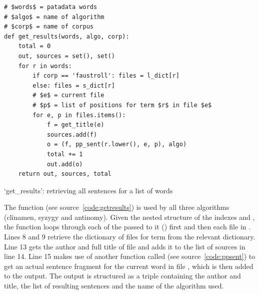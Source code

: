 \spirals


\begin{listing}
  \begin{verbatim}
# $words$ = patadata words
# $algo$ = name of algorithm
# $corp$ = name of corpus
def get_results(words, algo, corp):
    total = 0
    out, sources = set(), set()
    for r in words:
        if corp == 'faustroll': files = l_dict[r]
        else: files = s_dict[r]
        # $e$ = current file
        # $p$ = list of positions for term $r$ in file $e$
        for e, p in files.items():
            f = get_title(e)
            sources.add(f)
            o = (f, pp_sent(r.lower(), e, p), algo)
            total += 1
            out.add(o)
    return out, sources, total
  \end{verbatim}
\caption[`get\_results' function]{`get\_results': retrieving all sentences for a list of words}
\label{code:getresults}
\end{listing}

The  function (see source~\ref{code:getresults}) is used by all three algorithms (clinamen, syzygy and antinomy). Given the nested structure of the indexes  and , the function loops through each of the  passed to it () first and then each file in . Lines 8 and 9 retrieve the dictionary of files for term  from the relevant dictionary. Line 13 gets the author and full title of file  and adds it to the list of sources in line 14. Line 15 makes use of another function called  (see source~\ref{code:ppsent}) to get an actual sentence fragment for the current word  in file , which is then added to the output. The output is structured as a triple containing the author and title, the list of resulting sentences and the name of the algorithm used.

